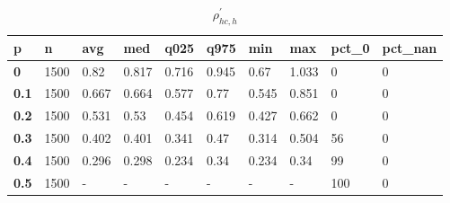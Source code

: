 \begin{table}[h]
 \centering 
\footnotesize
\caption{$\rho_{hc,h}^\prime $}
\label{tab:alphahch}
\begin{tabular}[h]{|l|l|l|l|l|l|l|l|l|l|
    } \hline
\textbf{ p} & \textbf{ n} & \textbf{ avg} & \textbf{ med} & \textbf{ q025} & \textbf{ q975} & \textbf{ min} & \textbf{ max} & \textbf{ pct\_0} & \textbf{ pct\_nan}
    \\ \hline
  \textbf{  0} & 1500 &  0.82 & 0.817 & 0.716 & 0.945 &  0.67 & 1.033 &   0 & 0
    \\ \hline
  \textbf{0.1} & 1500 & 0.667 & 0.664 & 0.577 &  0.77 & 0.545 & 0.851 &   0 & 0
    \\ \hline
  \textbf{0.2} & 1500 & 0.531 &  0.53 & 0.454 & 0.619 & 0.427 & 0.662 &   0 & 0
    \\ \hline
  \textbf{0.3} & 1500 & 0.402 & 0.401 & 0.341 &  0.47 & 0.314 & 0.504 &  56 & 0
    \\ \hline
  \textbf{0.4} & 1500 & 0.296 & 0.298 & 0.234 &  0.34 & 0.234 &  0.34 &  99 & 0
    \\ \hline
  \textbf{0.5} & 1500 & - & - & - & - & - & - & 100 & 0
    \\ \hline
 \end{tabular}
 \end{table}
